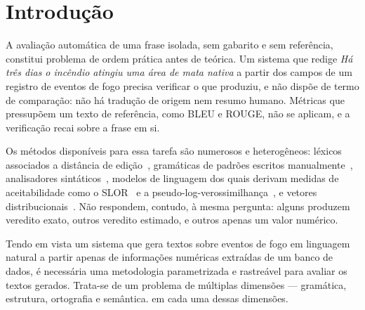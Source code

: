 \section{Introdução}
\label{sec:introducao}

A avaliação automática de uma frase isolada, sem gabarito e sem referência, constitui
problema de ordem prática antes de teórica. Um sistema que redige \emph{Há três dias o
incêndio atingiu uma área de mata nativa} a partir dos campos de um registro de eventos de
fogo precisa verificar o que produziu, e não dispõe de termo de comparação: não há tradução
de origem nem resumo humano. Métricas que pressupõem um texto de referência, como BLEU e
ROUGE, não se aplicam, e a verificação recai sobre a frase em si.

Os métodos disponíveis para essa tarefa são numerosos e heterogêneos: léxicos associados a
distância de edição~\cite{damerau1964,levenshtein1966,kukich1992}, gramáticas de padrões
escritos manualmente~\cite{naber2003,milkowski2010}, analisadores
sintáticos~\cite{nivre2016,rademaker2017}, modelos de linguagem dos quais derivam medidas de
aceitabilidade como o SLOR~\cite{pauls2012,lau2017} e a
pseudo-log-verossimilhança~\cite{wang2019,salazar2020}, e vetores
distribucionais~\cite{mikolov2013}. Não respondem, contudo, à mesma pergunta: alguns
produzem veredito exato, outros veredito estimado, e outros apenas um valor numérico.

Tendo em vista um sistema que gera textos sobre eventos de fogo em linguagem natural a
partir apenas de informações numéricas extraídas de um banco de dados, é necessária uma
metodologia parametrizada e rastreável para avaliar os textos gerados. Trata-se de um
problema de múltiplas dimensões --- gramática, estrutura, ortografia e semântica.
em cada uma dessas dimensões.
